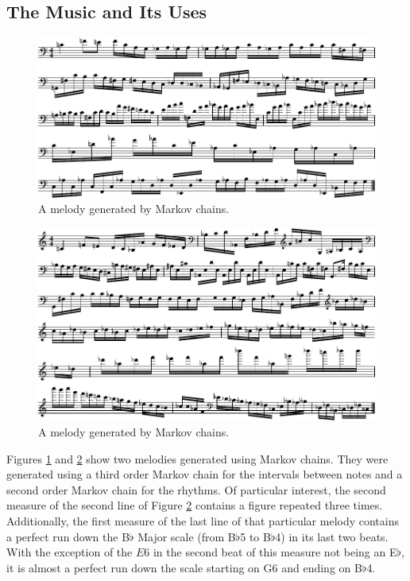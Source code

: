 \subsection{The Music and Its Uses}

\begin{figure}[h]
	\centering
	\includegraphics[width=\linewidth]{figures/markov_melody_1.pdf}
	\caption{A melody generated by Markov chains.}
	\label{fig:music:markov1}
\end{figure}

\begin{figure}[h]
	\centering
	\includegraphics[width=\linewidth]{figures/markov_melody_2.pdf}
	\caption{A melody generated by Markov chains.}
	\label{fig:music:markov2}
\end{figure}

Figures \ref{fig:music:markov1} and \ref{fig:music:markov2} show two melodies generated using Markov chains.
They were generated using a third order Markov chain for the intervals between notes and a second order Markov chain for the rhythms.
Of particular interest, the second measure of the second line of Figure \ref{fig:music:markov2} contains a figure repeated three times.
Additionally, the first measure of the last line of that particular melody contains a perfect run down the B$\flat$ Major scale (from B$\flat$5 to B$\flat$4) in its last two beats.
With the exception of the $E6$ in the second beat of this measure not being an E$\flat$, it is almost a perfect run down the scale starting on G6 and ending on B$\flat$4.

